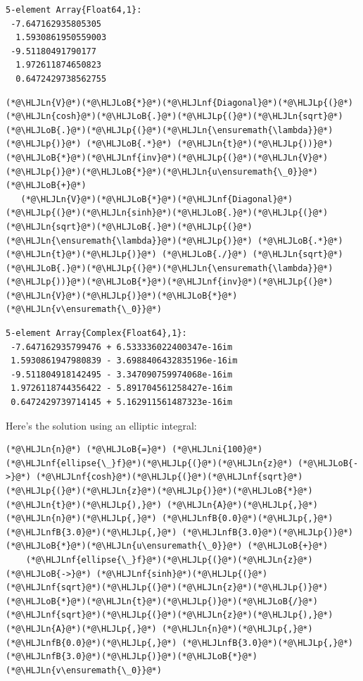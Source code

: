 \documentclass[12pt,a4paper]{article}
\newcommand{\HLJLn}[1]{#1}
\newcommand{\HLJLnf}[1]{\textcolor[RGB]{66,102,213}{#1}}
\newcommand{\HLJLnfB}[1]{\textcolor[RGB]{59,151,46}{#1}}
\newcommand{\HLJLni}[1]{\textcolor[RGB]{59,151,46}{#1}}
\newcommand{\HLJLoB}[1]{\textcolor[RGB]{102,102,102}{\textbf{#1}}}
\newcommand{\HLJLp}[1]{#1}
\begin{document}
\begin{lstlisting}
5-element Array{Float64,1}:
 -7.647162935805305 
  1.5930861950559003
 -9.51180491790177  
  1.972611874650823 
  0.6472429738562755
\end{lstlisting}


\begin{lstlisting}
(*@\HLJLn{V}@*)(*@\HLJLoB{*}@*)(*@\HLJLnf{Diagonal}@*)(*@\HLJLp{(}@*)(*@\HLJLn{cosh}@*)(*@\HLJLoB{.}@*)(*@\HLJLp{(}@*)(*@\HLJLn{sqrt}@*)(*@\HLJLoB{.}@*)(*@\HLJLp{(}@*)(*@\HLJLn{\ensuremath{\lambda}}@*)(*@\HLJLp{)}@*) (*@\HLJLoB{.*}@*) (*@\HLJLn{t}@*)(*@\HLJLp{))}@*)(*@\HLJLoB{*}@*)(*@\HLJLnf{inv}@*)(*@\HLJLp{(}@*)(*@\HLJLn{V}@*)(*@\HLJLp{)}@*)(*@\HLJLoB{*}@*)(*@\HLJLn{u\ensuremath{\_0}}@*) (*@\HLJLoB{+}@*) 
   (*@\HLJLn{V}@*)(*@\HLJLoB{*}@*)(*@\HLJLnf{Diagonal}@*)(*@\HLJLp{(}@*)(*@\HLJLn{sinh}@*)(*@\HLJLoB{.}@*)(*@\HLJLp{(}@*)(*@\HLJLn{sqrt}@*)(*@\HLJLoB{.}@*)(*@\HLJLp{(}@*)(*@\HLJLn{\ensuremath{\lambda}}@*)(*@\HLJLp{)}@*) (*@\HLJLoB{.*}@*) (*@\HLJLn{t}@*)(*@\HLJLp{)}@*) (*@\HLJLoB{./}@*) (*@\HLJLn{sqrt}@*)(*@\HLJLoB{.}@*)(*@\HLJLp{(}@*)(*@\HLJLn{\ensuremath{\lambda}}@*)(*@\HLJLp{))}@*)(*@\HLJLoB{*}@*)(*@\HLJLnf{inv}@*)(*@\HLJLp{(}@*)(*@\HLJLn{V}@*)(*@\HLJLp{)}@*)(*@\HLJLoB{*}@*)(*@\HLJLn{v\ensuremath{\_0}}@*)
\end{lstlisting}

\begin{lstlisting}
5-element Array{Complex{Float64},1}:
 -7.647162935799476 + 6.533336022400347e-16im 
 1.5930861947980839 - 3.6988406432835196e-16im
 -9.511804918142495 - 3.347090759974068e-16im 
 1.9726118744356422 - 5.891704561258427e-16im 
 0.6472429739714145 + 5.162911561487323e-16im
\end{lstlisting}


Here's the solution using an elliptic integral:


\begin{lstlisting}
(*@\HLJLn{n}@*) (*@\HLJLoB{=}@*) (*@\HLJLni{100}@*)
(*@\HLJLnf{ellipse{\_}f}@*)(*@\HLJLp{(}@*)(*@\HLJLn{z}@*) (*@\HLJLoB{->}@*) (*@\HLJLnf{cosh}@*)(*@\HLJLp{(}@*)(*@\HLJLnf{sqrt}@*)(*@\HLJLp{(}@*)(*@\HLJLn{z}@*)(*@\HLJLp{)}@*)(*@\HLJLoB{*}@*)(*@\HLJLn{t}@*)(*@\HLJLp{),}@*) (*@\HLJLn{A}@*)(*@\HLJLp{,}@*) (*@\HLJLn{n}@*)(*@\HLJLp{,}@*) (*@\HLJLnfB{0.0}@*)(*@\HLJLp{,}@*) (*@\HLJLnfB{3.0}@*)(*@\HLJLp{,}@*) (*@\HLJLnfB{3.0}@*)(*@\HLJLp{)}@*)(*@\HLJLoB{*}@*)(*@\HLJLn{u\ensuremath{\_0}}@*) (*@\HLJLoB{+}@*)
    (*@\HLJLnf{ellipse{\_}f}@*)(*@\HLJLp{(}@*)(*@\HLJLn{z}@*) (*@\HLJLoB{->}@*) (*@\HLJLnf{sinh}@*)(*@\HLJLp{(}@*)(*@\HLJLnf{sqrt}@*)(*@\HLJLp{(}@*)(*@\HLJLn{z}@*)(*@\HLJLp{)}@*)(*@\HLJLoB{*}@*)(*@\HLJLn{t}@*)(*@\HLJLp{)}@*)(*@\HLJLoB{/}@*)(*@\HLJLnf{sqrt}@*)(*@\HLJLp{(}@*)(*@\HLJLn{z}@*)(*@\HLJLp{),}@*) (*@\HLJLn{A}@*)(*@\HLJLp{,}@*) (*@\HLJLn{n}@*)(*@\HLJLp{,}@*) (*@\HLJLnfB{0.0}@*)(*@\HLJLp{,}@*) (*@\HLJLnfB{3.0}@*)(*@\HLJLp{,}@*) (*@\HLJLnfB{3.0}@*)(*@\HLJLp{)}@*)(*@\HLJLoB{*}@*)(*@\HLJLn{v\ensuremath{\_0}}@*)
\end{lstlisting}
\end{document}
